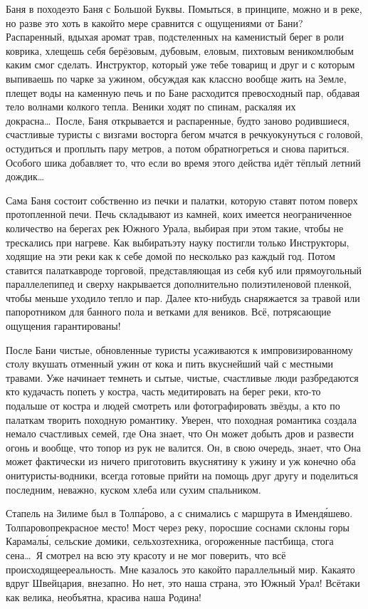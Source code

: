 Баня в походе\mdash это Баня с Большой Буквы. Помыться, в принципе, можно и в реке, но разве это хоть в какой\sdash то мере сравнится с ощущениями от Бани? Распаренный, вдыхая аромат трав, подстеленных на каменистый берег в роли коврика, хлещешь себя берёзовым, дубовым, еловым, пихтовым веником\mdash любым каким смог сделать. Инструктор, который уже тебе товарищ и друг и с которым выпиваешь по чарке за ужином, обсуждая как классно вообще жить на Земле, плещет воды на каменную печь и по Бане расходится превосходный пар, обдавая тело волнами колкого тепла. Веники ходят по спинам, раскаляя их докрасна\ldots~После, Баня открывается и распаренные, будто заново родившиеся, счастливые туристы с визгами восторга бегом мчатся в речку\mdash окунуться с головой, остудиться и проплыть пару метров, а потом обратно\mdash греться и снова париться. Особого шика добавляет то, что если во время этого действа идёт тёплый летний дождик\ldots  

Сама Баня состоит собственно из печки и палатки, которую ставят потом поверх протопленной печи. Печь складывают из камней, коих имеется неограниченное количество на берегах рек Южного Урала, выбирая при этом такие, чтобы не трескались при нагреве. Как выбирать\mdash эту науку постигли только Инструкторы, ходящие на эти реки как к себе домой по несколько раз каждый год. Потом ставится палатка\mdash вроде торговой, представляющая из себя куб или прямоугольный параллелепипед и сверху накрывается дополнительно полиэтиленовой пленкой, чтобы меньше уходило тепло и пар. Далее кто-нибудь снаряжается за травой или папоротником для банного пола и ветками для веников. Всё, потрясающие ощущения гарантированы!

После Бани чистые, обновленные туристы усаживаются к импровизированному столу вкушать отменный ужин от кока и пить вкуснейший чай с местными травами. Уже начинает темнеть и сытые, чистые, счастливые люди разбредаются кто куда\mdash часть попеть у костра, часть медитировать на берег реки, кто-то подальше от костра и людей смотреть или фотографировать звёзды, а кто по палаткам творить походную романтику. Уверен, что походная романтика создала немало счастливых семей, где Она знает, что Он может добыть дров и развести огонь и вообще, что топор из рук не валится. Он, в свою очередь, знает, что Она может фактически из ничего приготовить вкуснятину к ужину и уж конечно оба они\mdash туристы-водники, всегда готовые прийти на помощь друг другу и поделиться последним, неважно, куском хлеба или сухим спальником. 

Стапель на Зилиме был в Толп\'{а}рово, а с снимались с маршрута в Именд\'{я}шево. Толпарово\mdash прекрасное место! Мост через реку, поросшие соснами склоны горы Карамал\'{ы}, сельские домики, сельхозтехника, огороженные пастбища, стога сена\ldots~Я смотрел на всю эту красоту и не мог поверить, что всё происходящее\mdash реальность. Мне казалось это какой\sdash то параллельный мир. Какая\sdash то вдруг Швейцария, внезапно. Но нет, это наша страна, это Южный Урал! Всё\sdash таки как велика, необъятна, красива наша Родина!

